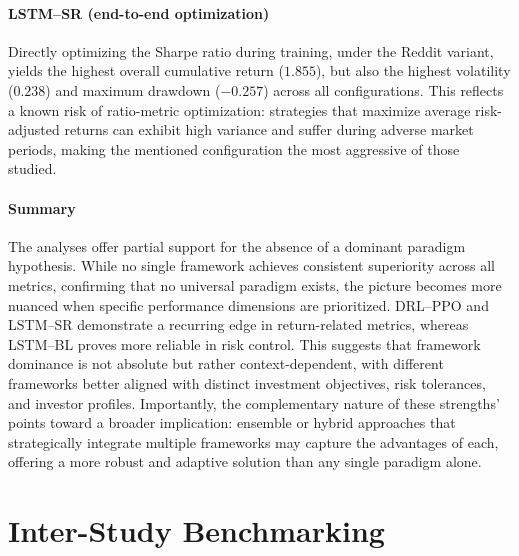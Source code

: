 \paragraph{LSTM--SR (end-to-end optimization)} Directly optimizing the Sharpe ratio during training, under the Reddit variant, yields the highest overall cumulative return ($1.855$), but also the highest volatility ($0.238$) and maximum drawdown ($-0.257$) across all configurations. This reflects a known risk of ratio-metric optimization: strategies that maximize average risk-adjusted returns can exhibit high variance and suffer during adverse market periods, making the mentioned configuration the most aggressive of those studied.

\paragraph{Summary} The analyses offer partial support for the absence of a dominant paradigm hypothesis. While no single framework achieves consistent superiority across all metrics, confirming that no universal paradigm exists, the picture becomes more nuanced when specific performance dimensions are prioritized. DRL--PPO and LSTM--SR demonstrate a recurring edge in return-related metrics, whereas LSTM--BL proves more reliable in risk control. This suggests that framework dominance is not absolute but rather context-dependent, with different frameworks better aligned with distinct investment objectives, risk tolerances, and investor profiles. Importantly, the complementary nature of these strengths' points toward a broader implication: ensemble or hybrid approaches that strategically integrate multiple frameworks may capture the advantages of each, offering a more robust and adaptive solution than any single paradigm alone.


\section{Inter-Study Benchmarking}
\label{sec:inter}


